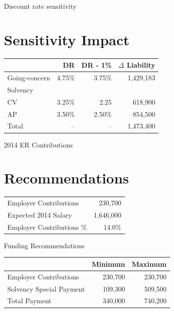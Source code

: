 \documentclass{beamer}
\begin{document}
\begin{frame}{Discount rate sensitivity}

\section{Sensitivity Impact}

\begin{table}[ht]
\begin{tabular}{l r r r}
\hline
& DR & DR - 1\% & $\Delta$ Liability \\ \hline
Going-concern & 4.75\% & 3.75\% & 1,429,183 \\
Solvency \\
\hspace{2mm} CV & 3.25\% & 2.25 & 618,900 \\
\hspace{2mm} AP & 3.50\% & 2.50\% & 854,500 \\
\hspace{2mm} Total & -- & -- & 1,473,400 \\ \hline
\end{tabular}
\end{table}

\end{frame}

\begin{frame}{2014 ER Contributions}

\section{Recommendations}

\begin{table}[ht]
\begin{tabular}{l r}
Employer Contributions & 230,700 \\
Expected 2014 Salary & 1,646,000 \\
Employer Contributions \% & 14.0\%
\end{tabular}
\end{table}

\end{frame}

\begin{frame}{Funding Recommendations}

\begin{table}[ht]
\begin{tabular}{l r r}
\hline
& Minimum & Maximum \\ \hline
Employer Contributions & 230,700 & 230,700 \\
Solvency Special Payment & 109,300 & 509,500 \\
Total Payment & 340,000 & 740,200 \\ \hline
\end{tabular}
\end{table}

\end{frame}
\end{document}
